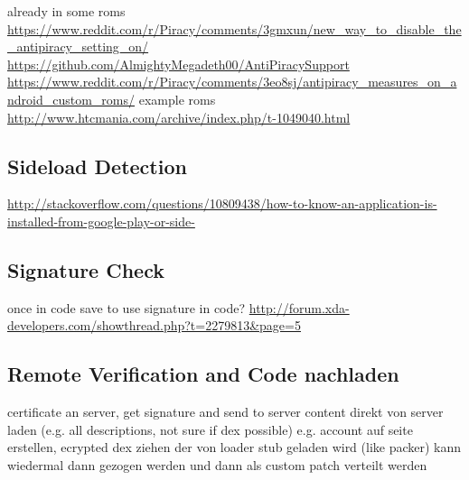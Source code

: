 already in some roms \url{https://www.reddit.com/r/Piracy/comments/3gmxun/new_way_to_disable_the_antipiracy_setting_on/}\newline
\url{https://github.com/AlmightyMegadeth00/AntiPiracySupport}\newline
\url{https://www.reddit.com/r/Piracy/comments/3eo8sj/antipiracy_measures_on_android_custom_roms/}\newline
example roms \url{http://www.htcmania.com/archive/index.php/t-1049040.html}\newline

\subsection{Sideload Detection}\label{subsection:tampering-sideload}
\url{http://stackoverflow.com/questions/10809438/how-to-know-an-application-is-installed-from-google-play-or-side-}
\subsection{Signature Check}\label{subsection:tampering-signature}
once in code \newline
save to use signature in code?\newline
\url{http://forum.xda-developers.com/showthread.php?t=2279813&page=5}\newline

\subsection{Remote Verification and Code nachladen}\label{subsection:external-remote}
certificate an server, get signature and send to server\newline
content direkt von server laden (e.g. all descriptions, not sure if dex possible)\newline
e.g. account auf seite erstellen, ecrypted dex ziehen der von loader stub geladen wird (like packer)
kann wiedermal dann gezogen werden und dann als custom patch verteilt werden\newline
